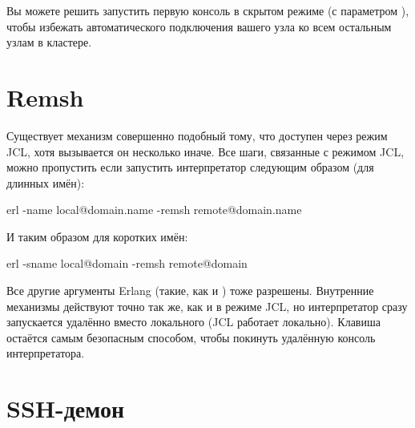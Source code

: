 Вы можете решить запустить первую консоль в скрытом режиме (с параметром ), чтобы избежать автоматического подключения вашего узла ко всем остальным узлам в кластере.


\section{Remsh}

Существует механизм совершенно подобный тому, что доступен через режим JCL, хотя вызывается он несколько иначе. Все шаги, связанные с режимом JCL, можно пропустить если запустить интерпретатор следующим образом (для длинных имён):

\begin{VerbatimText}
erl -name local@domain.name -remsh remote@domain.name
\end{VerbatimText}

И таким образом для коротких имён:

\begin{VerbatimText}
erl -sname local@domain -remsh remote@domain
\end{VerbatimText}

Все другие аргументы Erlang (такие, как  и ) тоже разрешены. Внутренние механизмы действуют точно так же, как и в режиме JCL, но интерпретатор сразу запускается удалённо вместо локального (JCL работает локально). Клавиша  остаётся самым безопасным способом, чтобы покинуть удалённую консоль интерпретатора.


\section{SSH-демон}

